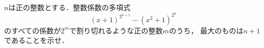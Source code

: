 \documentclass[../../main.tex]{subfiles}
\begin{document}
$n$は正の整数とする．整数係数の多項式
\[ { (x+1) }^{ 2^{n+1} } - { (x^2+1) }^{ 2^n } \]
のすべての係数が$2^m$で割り切れるような正の整数$m$のうち，
最大のものは$n+1$であることを示せ．
\end{document}
